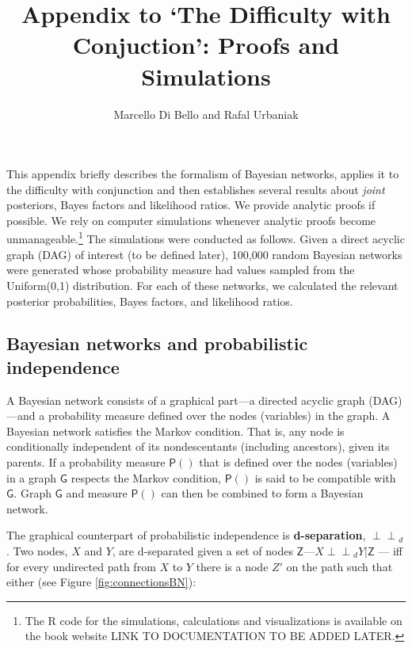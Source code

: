 \documentclass[
  10pt,
  dvipsnames,enabledeprecatedfontcommands]{scrartcl}
\title{Appendix to `The Difficulty with Conjuction': Proofs and
Simulations}
\author{Marcello Di Bello and Rafal Urbaniak}
\date{}
\newcommand{\indep}{\!\perp \!\!\! \perp\!}
\newcommand{\pr}[1]{\ensuremath{\mathsf{P}(#1)}}
\begin{document}
\maketitle

This appendix briefly describes the formalism of Bayesian networks,
applies it to the difficulty with conjunction and then establishes
several results about \textit{joint} posteriors, Bayes factors and
likelihood ratios. We provide analytic proofs if possible. We rely on
computer simulations whenever analytic proofs become
unmanageable.\footnote{The R code for the simulations, calculations and
  visualizations is available on the book website LINK TO DOCUMENTATION
  TO BE ADDED LATER.} The simulations were conducted as follows. Given a
direct acyclic graph (DAG) of interest (to be defined later), 100,000
random Bayesian networks were generated whose probability measure had
values sampled from the \textsf{Uniform(0,1)} distribution. For each of
these networks, we calculated the relevant posterior probabilities,
Bayes factors, and likelihood ratios.

\hypertarget{bayesian-networks-and-probabilistic-independence}{%
\subsection*{Bayesian networks and probabilistic
independence}\label{bayesian-networks-and-probabilistic-independence}}

A Bayesian network consists of a graphical part---a directed acyclic
graph (DAG)---and a probability measure defined over the nodes
(variables) in the graph. A Bayesian network satisfies the Markov
condition. That is, any node is conditionally independent of its
nondescentants (including ancestors), given its parents. If a
probability measure \(\pr{}\) that is defined over the nodes (variables)
in a graph \(\mathsf{G}\) respects the Markov condition, \(\pr{}\) is
said to be compatible with \(\mathsf{G}\). Graph \(\mathsf{G}\) and
measure \(\pr{}\) can then be combined to form a Bayesian network.

The graphical counterpart of probabilistic independence is
\textbf{d-separation}, \(\indep_d\). Two nodes, \(X\) and \(Y\), are
d-separated given a set of nodes
\(\mathsf{Z}\)---\(X\indep_d Y \vert \mathsf{Z}\) --- iff for every
undirected path from \(X\) to \(Y\) there is a node \(Z'\) on the path
such that either (see Figure \ref{fig:connectionsBN}):
\end{document}
